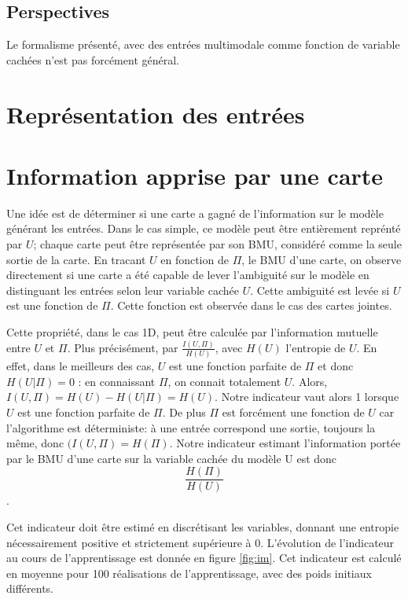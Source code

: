 \subsection{Perspectives}

Le formalisme présenté, avec des entrées multimodale comme fonction de variable cachées n'est pas forcément général.  

\section{Représentation des entrées}



\section{Information apprise par une carte}

Une idée est de déterminer si une carte a gagné de l'information sur le modèle générant les entrées. Dans le cas simple, ce modèle peut être entièrement reprénté par $U$; chaque carte peut être représentée par son BMU, considéré comme la seule sortie de la carte. 
En tracant $U$ en fonction de $\Pi$, le BMU d'une carte, on observe directement si une carte a été capable de lever l'ambiguité sur le modèle en distinguant les entrées selon leur variable cachée $U$. Cette ambiguité est levée si $U$ est une fonction de $\Pi$. Cette fonction est observée dans le cas des cartes jointes.

Cette propriété, dans le cas 1D, peut être calculée par l'information mutuelle entre $U$ et $\Pi$. Plus précisément, par $\frac{I(U,\Pi)}{H(U)}$, avec $H(U)$ l'entropie de $U$. 
En effet, dans le meilleurs des cas, $U$ est une fonction parfaite de $\Pi$ et donc $H(U|\Pi ) = 0$ : en connaissant $\Pi$, on connait totalement $U$. Alors, $I(U,\Pi) = H(U) - H(U| \Pi) = H(U)$. 
Notre indicateur vaut alors 1 lorsque $U$ est une fonction parfaite de $\Pi$.
De plus $\Pi$ est forcément une fonction de $U$ car l'algorithme est déterministe: à une entrée correspond une sortie, toujours la même, donc $(I(U, \Pi) = H(\Pi)$. Notre indicateur estimant l'information portée par le BMU d'une carte sur la variable cachée du modèle U est donc $$\frac{H(\Pi)}{H(U)}$$.

Cet indicateur doit être estimé en discrétisant les variables, donnant une entropie nécessairement positive et strictement supérieure à 0.
L'évolution de l'indicateur au cours de l'apprentissage est donnée en figure \ref{fig:im}. Cet indicateur est calculé en moyenne pour 100 réalisations de l'apprentissage, avec des poids initiaux différents. 

